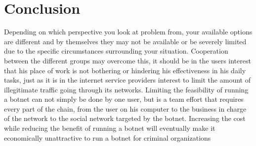 \section{Conclusion}
Depending on which perspective you look at problem from, your available options are different and by themselves they may not be available or be severely limited due to the specific circumstances surrounding your situation. Cooperation between the different groups may overcome this, it should be in the users interest that his place of work is not bothering or hindering his effectiveness in his daily tasks, just as it is in the internet service providers interest to limit the amount of illegitimate traffic going through its networks. Limiting the feasibility of running a botnet can not simply be done by one user, but is a team effort that requires every part of the chain, from the user on his computer to the business in charge of the network to the social network targeted by the botnet.
Increasing the cost while reducing the benefit of running a botnet will eventually make it economically unattractive to run a botnet for criminal organizations

